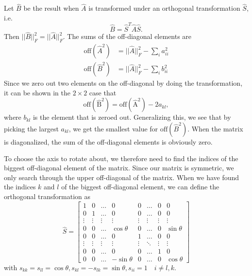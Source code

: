 \documentclass[%
 reprint,
nofootinbib,
aps,
]{revtex4-1}
\begin{document}
Let $\hat{B}$ be the result when $\hat{A}$ is transformed under an orthogonal transformation $\hat{S}$, i.e.
\begin{equation}
\hat{B} = \hat{S}^T\hat{A}\hat{S}.
\end{equation}
Then $\lvert\lvert\hat{B}\rvert\rvert_F^2 = \lvert\lvert\hat{A}\rvert\rvert_F^2$. The sums of the off-diagonal elements are
\begin{align}
\mathrm{off}(\hat{A}^2) &= \lvert\lvert\hat{A}\rvert\rvert_F^2 - \sum_i a_{ii}^2\\
\mathrm{off}(\hat{B}^2) &= \lvert\lvert\hat{A}\rvert\rvert_F^2 - \sum_i b_{ii}^2
\end{align}
Since we zero out two elements on the off-diagonal by doing the transformation, it can be shown in the $2\times 2$ case that
\begin{equation}
\mathrm{off(\hat{B}^2)} = \mathrm{off(\hat{A}^2)} -2a_{kl},
\end{equation}
where $b_{kl}$ is the element that is zeroed out. Generalizing this, we see that by picking the largest $a_{kl}$, we get the smallest value for $\mathrm{off}(\hat{B}^2)$. When the matrix is diagonalized, the sum of the off-diagonal elements is obviously zero.

To choose the axis to rotate about, we therefore need to find the indices of the biggest off-diagonal element of the matrix. Since our matrix is symmetric, we only search through the upper off-diagonal of the matrix. When we have found the indices $k$ and $l$ of the biggest off-diagonal element, we can define the orthogonal transformation as
\begin{equation}
\hat{S} =
\begin{bmatrix}
1 & 0 & \dots & 0 & 0 & \dots & 0 & 0\\
0 & 1 & \dots & 0 & 0 & \dots & 0 & 0\\
\vdots & \vdots & \vdots & \vdots & \vdots & \vdots & \vdots & \vdots\\
0 & 0 & \dots & \cos\theta & 0 & \dots & 0 & \sin\theta\\
0 & 0 & \dots & 0 & 1 & \dots & 0 & 0\\
\vdots & \vdots & \vdots & \vdots & \vdots & \ddots & \vdots & \vdots\\
0 & 0 & \dots & 0 & 0 & \dots & 1 & 0\\
0 & 0 & \dots & -\sin\theta & 0 & \dots & 0 & \cos\theta
\end{bmatrix}
\end{equation}
with $s_{kk} = s_{ll} = \cos\theta, s_{kl} = -s_{lk} = \sin\theta, s_{ii} = 1 \quad i \neq l, k$.
\end{document}
